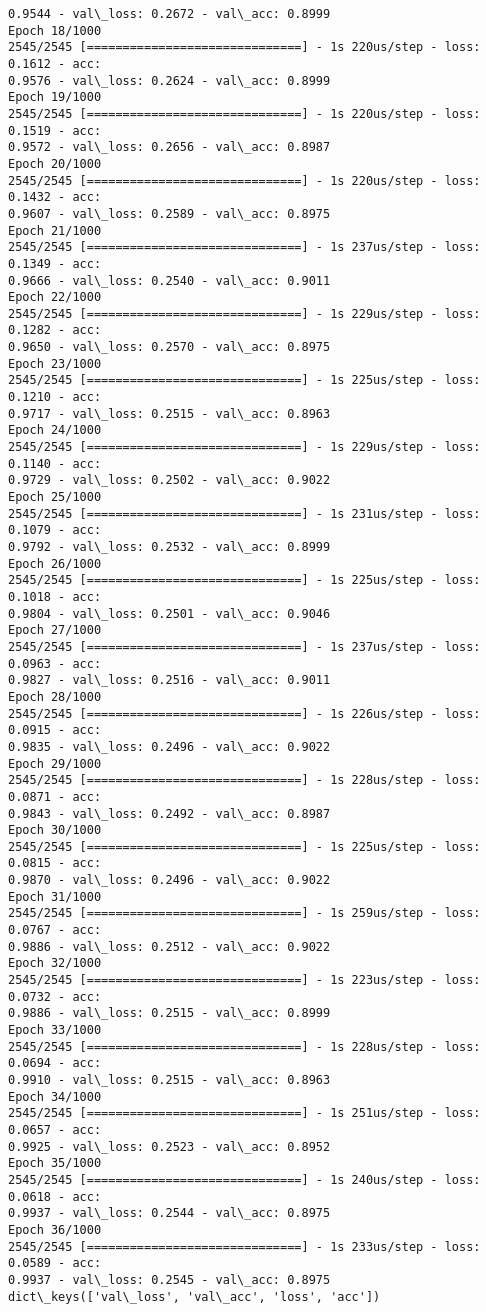 \documentclass[11pt]{article}
\begin{document}
\begin{Verbatim}[commandchars=\\\{\}]
0.9544 - val\_loss: 0.2672 - val\_acc: 0.8999
Epoch 18/1000
2545/2545 [==============================] - 1s 220us/step - loss: 0.1612 - acc:
0.9576 - val\_loss: 0.2624 - val\_acc: 0.8999
Epoch 19/1000
2545/2545 [==============================] - 1s 220us/step - loss: 0.1519 - acc:
0.9572 - val\_loss: 0.2656 - val\_acc: 0.8987
Epoch 20/1000
2545/2545 [==============================] - 1s 220us/step - loss: 0.1432 - acc:
0.9607 - val\_loss: 0.2589 - val\_acc: 0.8975
Epoch 21/1000
2545/2545 [==============================] - 1s 237us/step - loss: 0.1349 - acc:
0.9666 - val\_loss: 0.2540 - val\_acc: 0.9011
Epoch 22/1000
2545/2545 [==============================] - 1s 229us/step - loss: 0.1282 - acc:
0.9650 - val\_loss: 0.2570 - val\_acc: 0.8975
Epoch 23/1000
2545/2545 [==============================] - 1s 225us/step - loss: 0.1210 - acc:
0.9717 - val\_loss: 0.2515 - val\_acc: 0.8963
Epoch 24/1000
2545/2545 [==============================] - 1s 229us/step - loss: 0.1140 - acc:
0.9729 - val\_loss: 0.2502 - val\_acc: 0.9022
Epoch 25/1000
2545/2545 [==============================] - 1s 231us/step - loss: 0.1079 - acc:
0.9792 - val\_loss: 0.2532 - val\_acc: 0.8999
Epoch 26/1000
2545/2545 [==============================] - 1s 225us/step - loss: 0.1018 - acc:
0.9804 - val\_loss: 0.2501 - val\_acc: 0.9046
Epoch 27/1000
2545/2545 [==============================] - 1s 237us/step - loss: 0.0963 - acc:
0.9827 - val\_loss: 0.2516 - val\_acc: 0.9011
Epoch 28/1000
2545/2545 [==============================] - 1s 226us/step - loss: 0.0915 - acc:
0.9835 - val\_loss: 0.2496 - val\_acc: 0.9022
Epoch 29/1000
2545/2545 [==============================] - 1s 228us/step - loss: 0.0871 - acc:
0.9843 - val\_loss: 0.2492 - val\_acc: 0.8987
Epoch 30/1000
2545/2545 [==============================] - 1s 225us/step - loss: 0.0815 - acc:
0.9870 - val\_loss: 0.2496 - val\_acc: 0.9022
Epoch 31/1000
2545/2545 [==============================] - 1s 259us/step - loss: 0.0767 - acc:
0.9886 - val\_loss: 0.2512 - val\_acc: 0.9022
Epoch 32/1000
2545/2545 [==============================] - 1s 223us/step - loss: 0.0732 - acc:
0.9886 - val\_loss: 0.2515 - val\_acc: 0.8999
Epoch 33/1000
2545/2545 [==============================] - 1s 228us/step - loss: 0.0694 - acc:
0.9910 - val\_loss: 0.2515 - val\_acc: 0.8963
Epoch 34/1000
2545/2545 [==============================] - 1s 251us/step - loss: 0.0657 - acc:
0.9925 - val\_loss: 0.2523 - val\_acc: 0.8952
Epoch 35/1000
2545/2545 [==============================] - 1s 240us/step - loss: 0.0618 - acc:
0.9937 - val\_loss: 0.2544 - val\_acc: 0.8975
Epoch 36/1000
2545/2545 [==============================] - 1s 233us/step - loss: 0.0589 - acc:
0.9937 - val\_loss: 0.2545 - val\_acc: 0.8975
dict\_keys(['val\_loss', 'val\_acc', 'loss', 'acc'])
\end{Verbatim}
\end{document}

